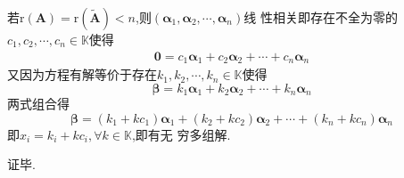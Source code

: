 \begin{formal}
\begin{Proof}
若$\mathrm{r}\left(\bm{A}\right)=\mathrm{r}\left(
    \widetilde{\bm{A}}
\right)<n$,则$\left(\bm{\alpha}_1,
\bm{\alpha}_2,\cdots,\bm{\alpha}_n\right)$线
性相关即存在不全为零的$c_1,c_2,\cdots,c_n\in \mathbb{K}$使得
\begin{align*}
    \bm{0}=c_1\bm{\alpha}_1
+c_2\bm{\alpha}_2+\cdots+
c_n\bm{\alpha}_n
\end{align*}
又因为方程有解等价于存在$k_1,k_2,\cdots,k_n\in \mathbb{K}$使得
\[
\bm{\beta}=k_1\bm{\alpha}_1+k_2\bm{\alpha}_2+\cdots+k_n\bm{\alpha}_n
\]
两式组合得
\[
\bm{\beta}=
\left(k_1+kc_1\right)\bm{\alpha}_1+\left(
    k_2+kc_2
\right)\bm{\alpha}_2+\cdots+\left(k_n+kc_n\right)
\bm{\alpha}_n
\]
即$\displaystyle
x_i=k_i+kc_i,\forall k\in \mathbb{K}$,即有无
穷多组解.

证毕.
\end{Proof}
\end{formal}
